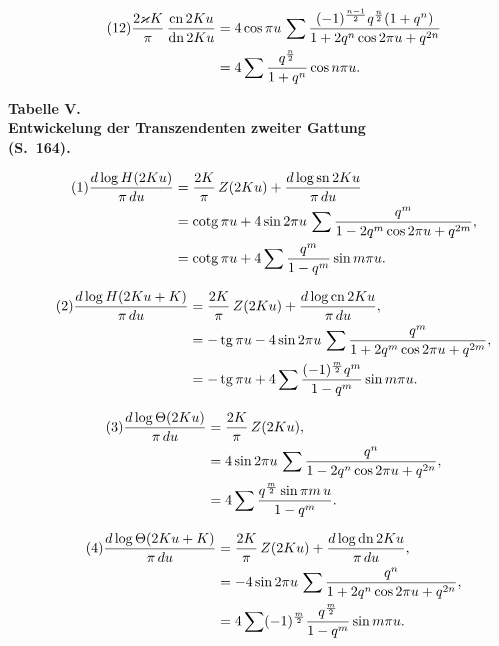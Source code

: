 \documentclass[12pt,a4paper]{article}
\DeclareMathOperator{\tg}{tg}
\DeclareMathOperator{\cotg}{cotg}
\DeclareMathOperator{\sn}{sn}
\DeclareMathOperator{\cn}{cn}
\DeclareMathOperator{\dn}{dn}
\begin{document}
\begin{align}
\tag{12}
\frac{2\varkappa K}{\pi}\,\frac{\cn2Ku}{\dn2Ku}
&= 4\cos\pi u\,\sum\frac{(-1)^{\frac{n-1}{2}}q^{\frac{n}{2}}(1+q^n)}{1+2q^n\cos2\pi u+q^{2n}} \notag\\
&= 4\sum\frac{q^{\frac{n}{2}}}{1+q^n}\cos n\pi u.
\end{align}

\newpage
\setcounter{page}{720}

\begin{center}
\large\textbf{Tabelle V.}\\[4pt]
\textbf{Entwickelung der Transzendenten zweiter Gattung}\\[2pt]
\textbf{(S.~164).}
\end{center}

\medskip

\begin{align}
\tag{1}
\frac{d\log H(2Ku)}{\pi\,du}
&= \frac{2K}{\pi}\,Z(2Ku) + \frac{d\log\sn2Ku}{\pi\,du} \notag\\
&= \cotg\pi u + 4\sin2\pi u\,\sum\frac{q^m}{1-2q^m\cos2\pi u+q^{2m}}, \notag\\
&= \cotg\pi u + 4\sum\frac{q^m}{1-q^m}\sin m\pi u.
\end{align}

\begin{align}
\tag{2}
\frac{d\log H(2Ku+K)}{\pi\,du}
&= \frac{2K}{\pi}\,Z(2Ku) + \frac{d\log\cn2Ku}{\pi\,du}, \notag\\
&= -\tg\pi u - 4\sin2\pi u\,\sum\frac{q^m}{1+2q^m\cos2\pi u+q^{2m}}, \notag\\
&= -\tg\pi u + 4\sum\frac{(-1)^{\frac{m}{2}}q^m}{1-q^m}\sin m\pi u.
\end{align}

\begin{align}
\tag{3}
\frac{d\log\Theta(2Ku)}{\pi\,du}
&= \frac{2K}{\pi}\,Z(2Ku), \notag\\
&= 4\sin2\pi u\,\sum\frac{q^n}{1-2q^n\cos2\pi u+q^{2n}}, \notag\\
&= 4\sum\frac{q^{\frac{m}{2}}\sin\pi m\,u}{1-q^m}.
\end{align}

\begin{align}
\tag{4}
\frac{d\log\Theta(2Ku+K)}{\pi\,du}
&= \frac{2K}{\pi}\,Z(2Ku) + \frac{d\log\dn2Ku}{\pi\,du}, \notag\\
&= -4\sin2\pi u\,\sum\frac{q^n}{1+2q^n\cos2\pi u+q^{2n}}, \notag\\
&= 4\sum(-1)^{\frac{m}{2}}\frac{q^{\frac{m}{2}}}{1-q^m}\sin m\pi u.
\end{align}
\end{document}
